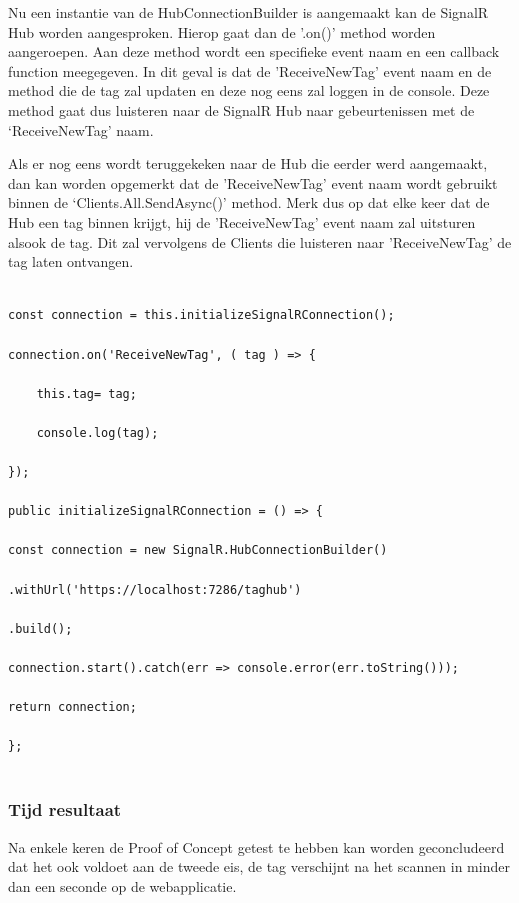 Nu een instantie van de HubConnectionBuilder is aangemaakt kan de SignalR Hub worden aangesproken. Hierop gaat dan de '.on()' method worden aangeroepen. Aan deze method wordt een specifieke event naam en een callback function meegegeven. In dit geval is dat de 'ReceiveNewTag’ event naam en de method die de tag zal updaten en deze nog eens zal loggen in de console. Deze method gaat dus luisteren naar de SignalR Hub naar gebeurtenissen met de ‘ReceiveNewTag' naam. 

Als er nog eens wordt teruggekeken naar de Hub die eerder werd aangemaakt, dan kan worden opgemerkt dat de 'ReceiveNewTag’ event naam wordt gebruikt binnen de ‘Clients.All.SendAsync()’ method. Merk dus op dat elke keer dat de Hub een tag binnen krijgt, hij de 'ReceiveNewTag’ event naam zal uitsturen alsook de tag. Dit zal vervolgens de Clients die luisteren naar 'ReceiveNewTag’ de tag laten ontvangen.

\begin{verbatim} 
    
const connection = this.initializeSignalRConnection(); 

connection.on('ReceiveNewTag', ( tag ) => { 
    
    this.tag= tag; 
    
    console.log(tag); 
    
}); 

public initializeSignalRConnection = () => { 

const connection = new SignalR.HubConnectionBuilder() 

.withUrl('https://localhost:7286/taghub') 

.build(); 

connection.start().catch(err => console.error(err.toString())); 

return connection; 

}; 
    
\end{verbatim} 

\subsubsection{Tijd resultaat}
Na enkele keren de Proof of Concept getest te hebben kan worden geconcludeerd dat het ook voldoet aan de tweede eis, de tag verschijnt na het scannen in minder dan een seconde op de webapplicatie.



